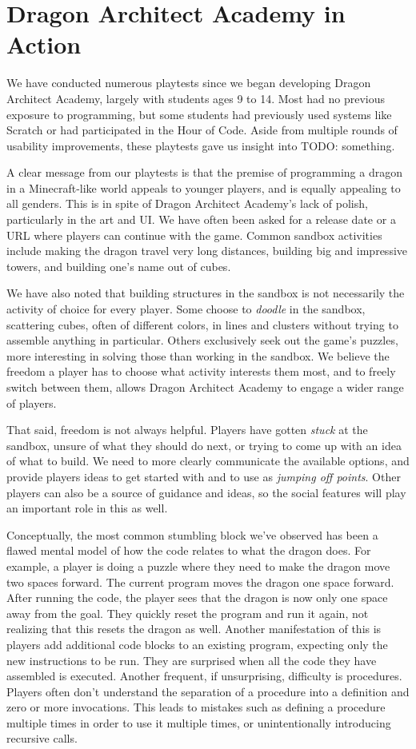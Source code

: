 \documentclass{sig-alternate}
\newcommand{\TODO}[1]{{\color{red} TODO: #1}}
\newcommand{\gametitle}{{\color{RoyalPurple} Dragon Architect Academy}}
\begin{document}
\section{\gametitle{} in Action}
\label{sec:action}
We have conducted numerous playtests since we began developing \gametitle{}, largely with students ages 9 to 14. 
Most had no previous exposure to programming, but some students had previously used systems like Scratch or had participated in the Hour of Code.
Aside from multiple rounds of usability improvements, these playtests gave us insight into \TODO{something}.

A clear message from our playtests is that the premise of programming a dragon in a Minecraft-like world appeals to younger players, and is equally appealing to all genders. 
This is in spite of \gametitle{}'s lack of polish, particularly in the art and UI. 
We have often been asked for a release date or a URL where players can continue with the game. 
Common sandbox activities include making the dragon travel very long distances, building big and impressive towers, and building one's name out of cubes.

We have also noted that building structures in the sandbox is not necessarily the activity of choice for every player. 
Some choose to \emph{doodle} in the sandbox, scattering cubes, often of different colors, in lines and clusters without trying to assemble anything in particular.
Others exclusively seek out the game's puzzles, more interesting in solving those than working in the sandbox.
We believe the freedom a player has to choose what activity interests them most, and to freely switch between them, allows \gametitle{} to engage a wider range of players.

That said, freedom is not always helpful.
Players have gotten \emph{stuck} at the sandbox, unsure of what they should do next, or trying to come up with an idea of what to build. 
We need to more clearly communicate the available options, and provide players ideas to get started with and to use as \emph{jumping off points}.
Other players can also be a source of guidance and ideas, so the social features will play an important role in this as well.

Conceptually, the most common stumbling block we've observed has been a flawed mental model of how the code relates to what the dragon does. 
For example, a player is doing a puzzle where they need to make the dragon move two spaces forward. 
The current program moves the dragon one space forward. 
After running the code, the player sees that the dragon is now only one space away from the goal. 
They quickly reset the program and run it again, not realizing that this resets the dragon as well. 
Another manifestation of this is players add additional code blocks to an existing program, expecting only the new instructions to be run. 
They are surprised when all the code they have assembled is executed. 
Another frequent, if unsurprising, difficulty is procedures. 
Players often don't understand the separation of a procedure into a definition and zero or more invocations. 
This leads to mistakes such as defining a procedure multiple times in order to use it multiple times, or unintentionally introducing recursive calls. 
\end{document}

